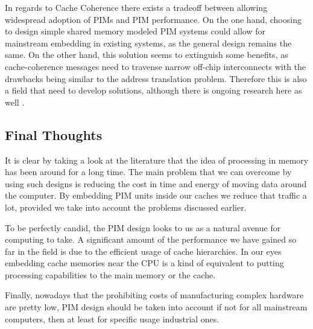 \documentclass[12pt,twocolumn]{IEEEtran}
\begin{document}
In regards to Cache Coherence there exists a tradeoff between allowing widespread adoption of PIMs and PIM performance. On the one hand, choosing to design simple shared memory modeled PIM systems could allow for mainstream embedding in existing systems, as the general design remains the same. On the other hand, this solution seems to extinguish some benefits, as cache-coherence messages need to travense narrow off-chip interconnects with the drawbacks being similar to the address translation problem. Therefore this is also a field that need to develop solutions, although there is ongoing research here as well \cite{PAPER:3}.

\subsection{Final Thoughts}
It is clear by taking a look at the literature that the idea of processing in memory has been around for a long time. The main problem that we can overcome by using such designs is reducing the cost in time and energy of moving data around the computer. By embedding PIM units inside our caches we reduce that traffic a lot, provided we take into account the problems discussed earlier. 

To be perfectly candid, the PIM design looks to us as a natural avenue for computing to take. A significant amount of the performance we have gained so far in the field is due to the efficient usage of cache hierarchies. In our eyes embedding cache memories near the CPU is a kind of equivalent to putting processing capabilities to the main memory or the cache.

Finally, nowadays that the prohibiting costs of manufacturing complex hardware are pretty low, PIM design should be taken into account if not for all mainstream computers, then at least for specific usage industrial ones.




\end{document}
